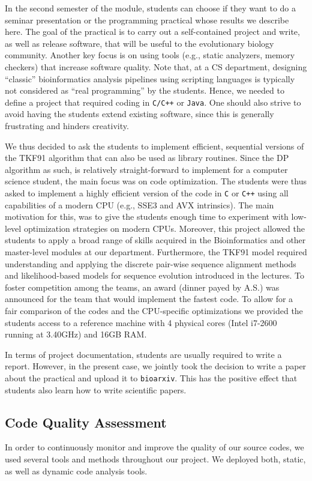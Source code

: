 \documentclass[runningheads,a4paper]{llncs}
\begin{document}
In the second semester of the module, students can choose if they want to do a seminar presentation or the programming practical whose results we describe here.
The goal of the practical is to carry out a self-contained project and write, as well as release software, that will be useful to the evolutionary biology community.
Another key focus is on using tools (e.g., static analyzers, memory checkers) that increase software quality.
Note that, at a CS department, designing ``classic'' bioinformatics analysis pipelines using scripting languages is typically not considered as ``real programming'' by the
students. Hence, we needed to define a project that required coding in \texttt{C/C++} or \texttt{Java}.
One should also strive to avoid having the students extend existing software, since
this is generally frustrating and hinders creativity.

We thus decided to ask the students to implement efficient, sequential versions of the TKF91 algorithm that can also be used as library routines.
Since the DP algorithm as such, is relatively straight-forward to implement for a computer science student, the main focus was on code optimization.
The students were thus asked to implement a highly efficient version of the code in \texttt{C} or \texttt{C++} using all capabilities of a modern CPU (e.g., SSE3 and AVX intrinsics).
The main motivation for this, was to give the students enough time to experiment with low-level optimization strategies on modern CPUs.
Moreover, this project allowed the students to apply a broad range of skills acquired in the Bioinformatics and other master-level modules at our department.
Furthermore, the TKF91 model required understanding and applying the discrete pair-wise sequence alignment methods and likelihood-based models for sequence evolution
introduced in the lectures.
To foster competition among the teams, an award (dinner payed by A.S.) was announced for the team that would implement the fastest code.
To allow for a fair comparison of the codes and the CPU-specific optimizations we provided the students access to a reference machine with
4 physical cores (Intel i7-2600 running at 3.40GHz) and 16GB RAM.

In terms of project documentation, students are usually required to write a report. However, in the present case, we jointly took the decision to write a paper
about the practical and upload it to \texttt{bioarxiv}. This has the positive effect that students also learn how to write scientific papers.

\subsection{Code Quality Assessment}
In order to continuously monitor and improve the quality of our source codes, we used several tools and methods throughout our project.
We deployed both, static, as well as dynamic code analysis tools.
\end{document}
